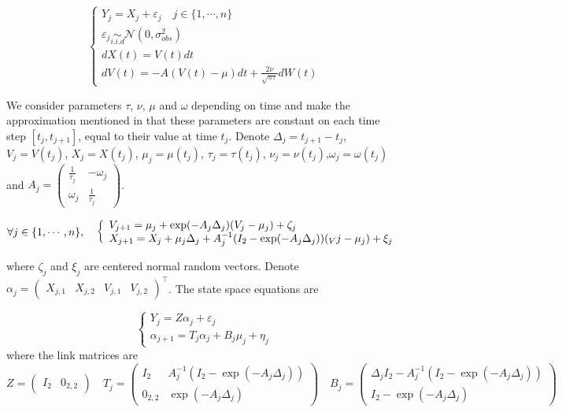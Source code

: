 \documentclass[11pt]{article}
\newcommand {\1}{\mathbb{1}}
\begin{document}
\begin{equation}  \left\{
	\begin{array}{l}
		Y_j=X_j+\varepsilon_j \quad j \in \{1,\cdots,n\}\\
		\varepsilon_j \underset{i.i.d}{\sim} \mathcal{N}(0,\sigma_{obs}^2)  \\
		dX(t)=V(t)dt  \\
		dV(t)=-A(V(t)-\mu)dt+\frac{2\nu}{\sqrt{\pi \tau}} dW(t) 
	\end{array}
	\right.
\end{equation}



We consider parameters $\tau$, $\nu$, $\mu$ and $\omega$ depending on time and make the approximation mentioned in \cite{michelot_varying-coefficient_2021} that these parameters are constant on each time step $[t_j,t_{j+1}]$, equal to their value at time $t_j$. Denote $\Delta_j=t_{j+1}-t_j$, $V_j=V(t_j)$, $X_j=X(t_j)$, $\mu_j=\mu(t_j)$, $\tau_j=\tau(t_j)$, $\nu_j=\nu(t_j)$,$\omega_j=\omega(t_j)$ and $A_j=\begin{pmatrix} 
	\frac{1}{\tau_j} & -\omega_j \\
	\omega_j & \frac{1}{\tau_j}
\end{pmatrix}$.

\begin{equation}
	\forall j \in \{1, \cdots, n\}, \quad 
	\left\{ \begin{array}{l}
		V_{j+1}=\mu_j +\exp(-A_j\Delta_j)(V_j-\mu_j)+\zeta_j \\
		X_{j+1}=X_j+\mu_j \Delta_j+A_j^{-1}(I_2-\exp(-A_j\Delta_j))(_Vj-\mu_j)+\xi_j
	\end{array}\right. \\
	\label{eq: RCVM autoregressive formula}
\end{equation}


where $\zeta_j$ and $\xi_j$ are centered normal random vectors.
Denote $\alpha_j=\begin{pmatrix} X_{j,1}  & X_{j,2} & V_{j,1} & V_{j,2}\end{pmatrix}^\top$. The state space equations are

\[
\left\{
\begin{array}{l}
	Y_j=Z\alpha_j+\varepsilon_j \\
	\alpha_{j+1}=T_j \alpha_j+B_j \mu_j + \eta_j
\end{array}
\right.\]
where the link matrices are 
\[Z=\begin{pmatrix} I_2 & 0_{2,2}\end{pmatrix} \quad  T_j=\begin{pmatrix} I_2 & A_j^{-1}(I_2-\exp(-A_j \Delta_j)) \\ 0_{2,2} & \exp(-A_j \Delta_j) \end{pmatrix} \quad B_j=\begin{pmatrix}
	\Delta_j I_2-A_j^{-1}(I_2-\exp(-A_j\Delta_j)) \\
	I_2-\exp(-A_j\Delta_j)\end{pmatrix}
\]
\end{document}
